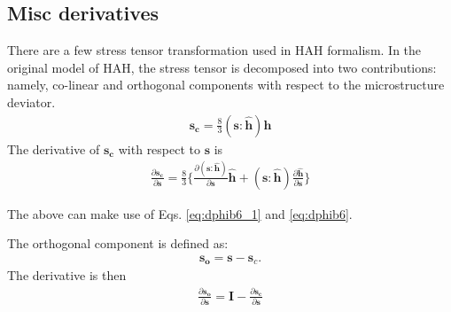 \documentclass[12pt]{amsart}
\begin{document}
\subsection{Misc derivatives}
\label{sec:misc}



There are a few stress tensor transformation used in HAH formalism.
In the original model of HAH, the stress tensor is decomposed into two contributions: namely, co-linear and orthogonal components with respect to the microstructure deviator.
\begin{eqnarray}
  \label{eq:decomp1}
  \mathbf{s_c} = \frac{8}{3} (\mathbf{s}:\hat{\mathbf{h}}) \mathbf{h}
\end{eqnarray}
The derivative of $\mathbf{s_c}$ with respect to $\mathbf{s}$ is
\begin{eqnarray}
  \label{eq:decomp2}
  \frac{\partial\mathbf{s_c}}{\partial\mathbf{s}} = \frac{8}{3}\bigg\{ \frac{\partial(\mathbf{s}:\hat{\mathbf{h}})}{\partial\mathbf{s}} \hat{\mathbf{h}}+ (\mathbf{s}:\hat{\mathbf{h}}) \frac{\partial\hat{\mathbf{h}}}{\partial\mathbf{s}}  \bigg\}
\end{eqnarray}

The above can make use of Eqs. \ref{eq:dphib6_1} and \ref{eq:dphib6}.

The orthogonal component is defined as:
\begin{eqnarray}
  \label{eq:decomp3}
  \mathbf{s_o} = \mathbf{s} - \mathbf{s}_c.
\end{eqnarray}
The derivative is then
\begin{eqnarray}
  \label{eq:decomp4}
  \frac{\partial\mathbf{s_o}}{\partial\mathbf{s}} = \mathbf{I} -   \frac{\partial\mathbf{s_c}}{\partial\mathbf{s}}
\end{eqnarray}
\end{document}
